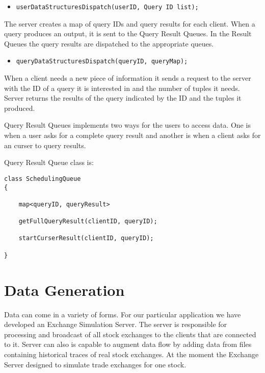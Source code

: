 \documentclass[11pt]{article}
\begin{document}
\begin{itemize}
	\item {\tt userDataStructuresDispatch(userID, Query ID list);}
\end{itemize}

\noindent The server creates a map of query IDs and query results for each client. When a query produces an output, it is sent to the Query Result Queues. In the Result Queues the query results are dispatched to the appropriate queues.

\begin{itemize}
	\item {\tt queryDataStructuresDispatch(queryID, queryMap);}
\end{itemize}

\noindent When a client needs a new piece of information it sends a request to the server with the ID of a query it is interested in and the number of tuples it needs. Server returns the results of the query indicated by the ID and the tuples it produced. 

Query Result Queues implements two ways for the users to access data. One is when a user asks for a complete query result and another is when a client asks for an curser to query results.

Query Result Queue class is:

\begin{verbatim}
class SchedulingQueue
{
    
	map<queryID, queryResult>
	
	getFullQueryResult(clientID, queryID);
	
	startCurserResult(clientID, queryID);
	
}
\end{verbatim}




\section{Data Generation}

Data can come in a variety of forms. For our particular application we have developed an Exchange Simulation Server. The server is responsible for processing and broadcast of all stock exchanges to the clients that are connected to it. Server can also is capable to augment data flow by adding data from files containing historical traces of real stock exchanges. At the moment the Exchange Server designed to simulate trade exchanges for one stock.   
\end{document}
